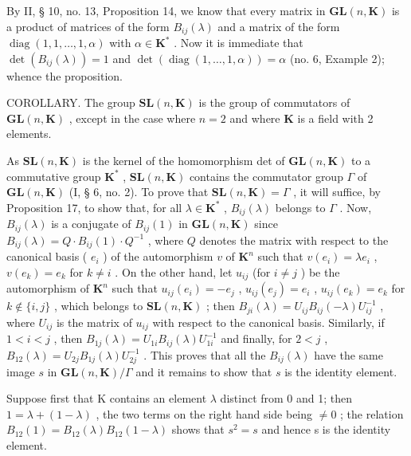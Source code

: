 By II, § 10, no. 13, Proposition 14, we know that every matrix in \(\mathbf{GL}(n,\mathbf{K})\) is a product of matrices of the form \(B_{ij}(\lambda)\) and a matrix of the form \(\operatorname{diag}(1,1,\ldots,1,\alpha)\) with \(\alpha\in\mathbf{K}^{*}\) . Now it is immediate that \(\det(B_{ij}(\lambda))=1\) and \(\det(\operatorname{diag}(1,\ldots,1,\alpha))=\alpha\) (no. 6, Example 2); whence the proposition.

COROLLARY. The group \(\mathbf{SL}(n, \mathbf{K})\) is the group of commutators of \(\mathbf{GL}(n, \mathbf{K})\) , except in the case where \(n = 2\) and where \(\mathbf{K}\) is a field with 2 elements.

As \(\mathbf{SL}(n, \mathbf{K})\) is the kernel of the homomorphism det of \(\mathbf{GL}(n, \mathbf{K})\) to a commutative group \(\mathbf{K}^*\) , \(\mathbf{SL}(n, \mathbf{K})\) contains the commutator group \(\Gamma\) of \(\mathbf{GL}(n, \mathbf{K})\) (I, § 6, no. 2). To prove that \(\mathbf{SL}(n, \mathbf{K}) = \Gamma\) , it will suffice, by Proposition 17, to show that, for all \(\lambda \in \mathbf{K}^*\) , \(B_{ij}(\lambda)\) belongs to \(\Gamma\) . Now, \(B_{ij}(\lambda)\) is a conjugate of \(B_{ij}(1)\) in \(\mathbf{GL}(n, \mathbf{K})\) since \(B_{ij}(\lambda) = Q \cdot B_{ij}(1) \cdot Q^{-1}\) , where \(Q\) denotes the matrix with respect to the canonical basis ( \(e_i\) ) of the automorphism \(v\) of \(\mathbf{K}^n\) such that \(v(e_i) = \lambda e_i\) , \(v(e_k) = e_k\) for \(k \neq i\) . On the other hand, let \(u_{ij}\) (for \(i \neq j\) ) be the automorphism of \(\mathbf{K}^n\) such that \(u_{ij}(e_i) = -e_j\) , \(u_{ij}(e_j) = e_i\) , \(u_{ij}(e_k) = e_k\) for \(k \notin \{i, j\}\) , which belongs to \(\mathbf{SL}(n, \mathbf{K})\) ; then \(B_{ji}(\lambda) = U_{ij}B_{ij}(-\lambda)U_{ij}^{-1}\) , where \(U_{ij}\) is the matrix of \(u_{ij}\) with respect to the canonical basis. Similarly, if \(1 < i < j\) , then \(B_{1j}(\lambda) = U_{1i}B_{ij}(\lambda)U_{1i}^{-1}\) and finally, for \(2 < j\) , \(B_{12}(\lambda) = U_{2j}B_{1j}(\lambda)U_{2j}^{-1}\) . This proves that all the \(B_{ij}(\lambda)\) have the same image \(s\) in \(\mathbf{GL}(n, \mathbf{K}) / \Gamma\) and it remains to show that \(s\) is the identity element.

Suppose first that K contains an element \(\lambda\) distinct from 0 and 1; then \(1 = \lambda + (1 - \lambda)\) , the two terms on the right hand side being \(\neq 0\) ; the relation \(B_{12}(1) = B_{12}(\lambda)B_{12}(1 - \lambda)\) shows that \(s^{2} = s\) and hence s is the identity element.

